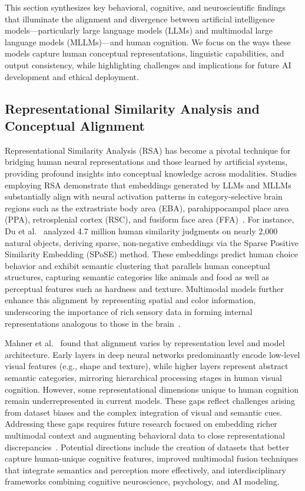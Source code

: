 \documentclass[sigconf]{acmart}
\begin{document}
This section synthesizes key behavioral, cognitive, and neuroscientific findings that illuminate the alignment and divergence between artificial intelligence models—particularly large language models (LLMs) and multimodal large language models (MLLMs)—and human cognition. We focus on the ways these models capture human conceptual representations, linguistic capabilities, and output consistency, while highlighting challenges and implications for future AI development and ethical deployment.

\subsection{Representational Similarity Analysis and Conceptual Alignment}

Representational Similarity Analysis (RSA) has become a pivotal technique for bridging human neural representations and those learned by artificial systems, providing profound insights into conceptual knowledge across modalities. Studies employing RSA demonstrate that embeddings generated by LLMs and MLLMs substantially align with neural activation patterns in category-selective brain regions such as the extrastriate body area (EBA), parahippocampal place area (PPA), retrosplenial cortex (RSC), and fusiform face area (FFA)~\cite{ref1,ref2}. For instance, Du et al.~\cite{ref1} analyzed 4.7 million human similarity judgments on nearly 2,000 natural objects, deriving sparse, non-negative embeddings via the Sparse Positive Similarity Embedding (SPoSE) method. These embeddings predict human choice behavior and exhibit semantic clustering that parallels human conceptual structures, capturing semantic categories like animals and food as well as perceptual features such as hardness and texture. Multimodal models further enhance this alignment by representing spatial and color information, underscoring the importance of rich sensory data in forming internal representations analogous to those in the brain~\cite{ref2}.

Mahner et al.~\cite{ref2} found that alignment varies by representation level and model architecture. Early layers in deep neural networks predominantly encode low-level visual features (e.g., shape and texture), while higher layers represent abstract semantic categories, mirroring hierarchical processing stages in human visual cognition. However, some representational dimensions unique to human cognition remain underrepresented in current models. These gaps reflect challenges arising from dataset biases and the complex integration of visual and semantic cues. Addressing these gaps requires future research focused on embedding richer multimodal context and augmenting behavioral data to close representational discrepancies~\cite{ref2,ref4,ref5}. Potential directions include the creation of datasets that better capture human-unique cognitive features, improved multimodal fusion techniques that integrate semantics and perception more effectively, and interdisciplinary frameworks combining cognitive neuroscience, psychology, and AI modeling.
\end{document}
